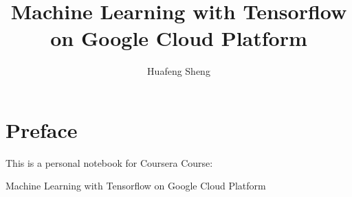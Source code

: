 \documentclass[9pt,twocolumn,oneside,a4paper]{book}
\theoremstyle{plain}
\theoremstyle{definition}
\theoremstyle{remark}
\begin{document}
	\frontmatter%
	\title{\textbf{Machine Learning with Tensorflow\\on Google Cloud Platform}}
	\author{Huafeng Sheng}
	\maketitle
	\tableofcontents
	
	\chapter{Preface}
	This is a personal notebook for Coursera Course: 
	
	Machine Learning with Tensorflow on Google Cloud Platform
	
	\mainmatter%
	
	
	\medskip
%	
%	
	
	\backmatter%
	
\end{document}
